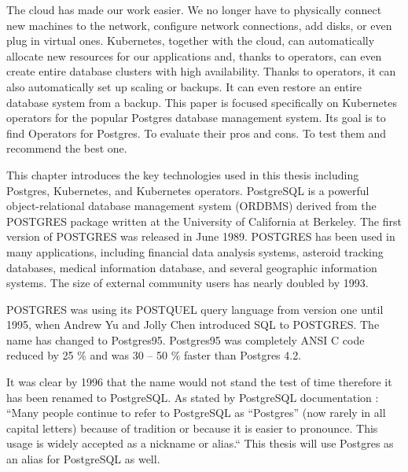 
The cloud has made our work easier. We no longer have to physically connect new machines to the network, configure network connections, add disks, or even plug in virtual ones. Kubernetes, together with the cloud, can automatically allocate new resources for our applications and, thanks to operators, can even create entire database clusters with high availability. Thanks to operators, it can also automatically set up scaling or backups. It can even restore an entire database system from a backup. This paper is focused specifically on Kubernetes operators for the popular Postgres database management system. Its goal is to find Operators for Postgres. To evaluate their pros and cons. To test them and recommend the best one.


This chapter introduces the key technologies used in this thesis including Postgres, Kubernetes, and Kubernetes operators.
PostgreSQL is a powerful object-relational database management system (ORDBMS) derived from the POSTGRES package written at the University of California at Berkeley. \cite{docuPgwhatIsPg} \cite{pg14introduction} The first version of POSTGRES was released in June 1989. POSTGRES has been used in many applications, including financial data analysis systems, asteroid tracking databases, medical information database, and several geographic information systems. The size of external community users has nearly doubled by 1993. \cite{docuPgBriefHistory}

POSTGRES was using its POSTQUEL query language from version one until 1995, when Andrew Yu and Jolly Chen introduced SQL to POSTGRES. The name has changed to Postgres95. Postgres95 was completely ANSI C code reduced by 25 \% and was 30 – 50 \% faster than Postgres 4.2.  \cite{docuPgBriefHistory}

It was clear by 1996 that the name would not stand the test of time therefore it has been renamed to PostgreSQL. As stated by PostgreSQL documentation \cite{docuPgBriefHistory}: “Many people continue to refer to PostgreSQL as “Postgres” (now rarely in all capital letters) because of tradition or because it is easier to pronounce. This usage is widely accepted as a nickname or alias.“ This thesis will use Postgres as an alias for PostgreSQL as well.

